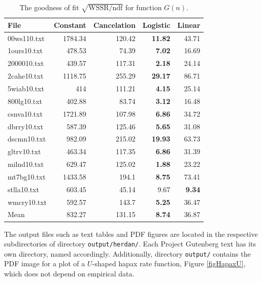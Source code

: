 \documentclass[a4paper,12pt]{article}
\newcommand{\toprule}{\hline}
\newcommand{\midrule}{\hline}
\newcommand{\botrule}{\hline}
\begin{document}
\begin{table}[p]
  \caption{The goodness of fit $\sqrt{\text{WSSR/ndf}}$ for
    function $G(n)$.\label{tabWSSRs}}
  \centering
  \medskip
  \begin{tabular}{|l|r|r|r|r|}
    \toprule
File    & Constant      & Cancelation & Logistic      & Linear\\
\midrule
00ws110.txt     & 1784.34       & 120.42        & \textbf{11.82}        & 43.71\\
1ours10.txt     & 478.53        & 74.39 & \textbf{7.02} & 16.69\\
2000010.txt     & 439.57        & 117.31        & \textbf{2.18} & 24.14\\
2cahe10.txt     & 1118.75       & 255.29        & \textbf{29.17}        & 86.71\\
5wiab10.txt     & 414   & 111.21        & \textbf{4.15} & 25.14\\
800lg10.txt     & 402.88        & 83.74 & \textbf{3.12} & 16.48\\
csnva10.txt     & 1721.89       & 107.98        & \textbf{6.86} & 34.72\\
dbrry10.txt     & 587.39        & 125.46        & \textbf{5.65} & 31.08\\
dscmn10.txt     & 982.09        & 215.02        & \textbf{19.93}        & 63.73\\
gltrv10.txt     & 463.34        & 117.35        & \textbf{6.86} & 31.39\\
milnd10.txt     & 629.47        & 125.02        & \textbf{1.88} & 23.22\\
mt7bg10.txt     & 1433.58       & 194.1 & \textbf{8.75} & 73.41\\
stlla10.txt     & 603.45        & 45.14 & 9.67  & \textbf{9.34}\\
wmcry10.txt     & 592.57        & 143.7 & \textbf{5.25} & 36.47\\
\midrule
Mean    & 832.27        & 131.15        & \textbf{8.74} & 36.87\\
\botrule
  \end{tabular}
\end{table}

The output files such as text tables and PDF figures are located in
the respective subdirectories of directory \verb}output/herdan/}. Each
Project Gutenberg text has its own directory, named
accordingly. Additionally, directory \verb}output/} contains the PDF
image for a plot of a $U$-shaped hapax rate function, Figure
\ref{figHapaxU}, which does not depend on empirical data.
\end{document}

